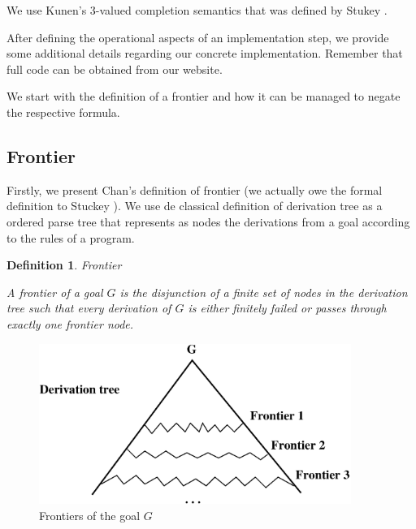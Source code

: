 \documentclass{tlp}
\newtheorem{definition}{Definition} %
\newcommand{\naf}{{\em naf}}\newcommand{\viejo}[1]{}
\begin{document}

We use Kunen's 3-valued completion semantics that was defined by
Stukey \cite{Stuckey95}.



After defining the operational aspects of an implementation step, we
provide some additional details regarding our concrete
implementation. Remember that full code can be obtained from our
website.

We start with the definition of a frontier and how it can be managed
to negate the respective formula.


\subsection{Frontier}
\label{frontier}

  
Firstly, we present Chan's definition of frontier (we actually owe the
formal definition to Stuckey \cite{Stuckey95}). We use de classical
definition of derivation tree as a ordered parse tree that represents
as nodes the derivations from a goal according to the rules of a
program.

\begin{definition}{\em Frontier}

A frontier of a goal $G$ is the disjunction of a finite set of nodes
in the derivation tree such that every derivation of $G$ is either
finitely failed or passes through exactly one {\em frontier node}.
\end{definition}

  \begin{figure}
        \centering
        \includegraphics[width=4in]{tree_frontier.eps}  
        \caption{Frontiers of the goal $G$}
        \label{fig:tree_frontier}
  \end{figure}
\end{document}
